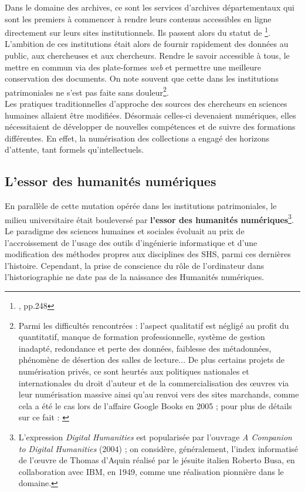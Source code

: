 Dans le domaine des archives, ce sont les services d'archives départementaux qui sont les premiers à commencer à rendre leurs contenus accessibles en ligne directement sur leurs sites institutionnels. Ils passent alors du statut de \footnote{\cite{limon-bonnet_innovation_2019}, pp.248}. L'ambition de ces institutions était alors de fournir rapidement des données au public, aux chercheuses et aux chercheurs. Rendre le savoir accessible à tous, le mettre en commun via des plate-formes \textit{web} et permettre une meilleure conservation des documents.
On note souvent que cette  dans les institutions patrimoniales ne s'est pas faite sans douleur\footnote{Parmi les difficultés rencontrées : l'aspect qualitatif est négligé au profit du quantitatif, manque de formation professionnelle, système de gestion inadapté, redondance et perte des données, faiblesse des métadonnées, phénomène de désertion des salles de lecture... De plus certains projets de numérisation privés, ce sont heurtés aux politiques nationales et internationales du droit d'auteur et de la commercialisation des \oe{}uvres via leur numérisation massive ainsi qu'au renvoi vers des sites marchands, comme cela a été le cas lors de l'affaire Google Books en 2005 ; pour plus de détails sur ce fait : \cite{jeanneney_quand_2010}}.\\Les pratiques traditionnelles d'approche des sources des chercheurs en sciences humaines allaient être modifiées. Désormais celles-ci devenaient numériques, elles nécessitaient de développer de nouvelles compétences et de suivre des formations différentes. En effet, la numérisation des collections a engagé des horizons d'attente, tant formels qu'intellectuels.

\subsection{L'essor des humanités numériques}\label{essor_humanités_num}

En parallèle de cette mutation opérée dans les institutions patrimoniales, le milieu universitaire était bouleversé par \textbf{l'essor des humanités numériques}\footnote{L'expression \textit{Digital Humanities} est popularisée par l'ouvrage \textit{A Companion to Digital Humanities} (2004) ; on considère, généralement, l'index informatisé de l'\oe{}uvre de Thomas d'Aquin réalisé par le jésuite italien Roberto Busa, en collaboration avec IBM, en 1949, comme une réalisation pionnière dans le domaine.}. Le paradigme des sciences humaines et sociales évoluait au prix de l'accroissement de  l'usage des outils d'ingénierie informatique et d'une modification des méthodes propres aux disciplines des SHS, parmi ces dernières l'histoire. Cependant, la prise de conscience du rôle de l'ordinateur dans l'historiographie ne date pas de la naissance des Humanités numériques.\\ 

